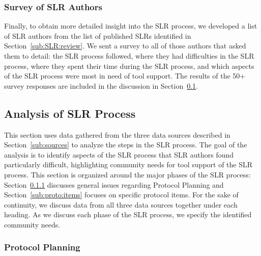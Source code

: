 \subsubsection{Survey of SLR Authors}
\label{sub:SLR:survey}

Finally, to obtain more detailed insight into the SLR process, we developed a list of SLR authors from the list of published SLRs identified in Section~\ref{sub:SLR:review}. We sent a survey to all of those authors that asked them to detail: the SLR process followed, where they had difficulties in the SLR process, where they spent their time during the SLR process, and which aspects of the SLR process were most in need of tool support. The results of the 50+ survey responses are included in the discussion in Section~\ref{sub:analysis}.

\subsection{Analysis of SLR Process}
\label{sub:analysis}

This section uses data gathered from the three data sources described in Section~\ref{sub:sources} to analyze the steps in the SLR process. The goal of the analysis is to identify aspects of the SLR process that SLR authors found particularly difficult, highlighting community needs for tool support of the SLR process. This section is organized around the major phases of the SLR process: Section~\ref{sub:proto:plan} discusses general issues regarding Protocol Planning and Section~\ref{sub:proto:items} focuses on specific protocol items. For the sake of continuity, we discuss data from all three data sources together under each heading. As we discuss each phase of the SLR process, we specify the identified community needs.


\subsubsection{Protocol Planning}
\label{sub:proto:plan}


